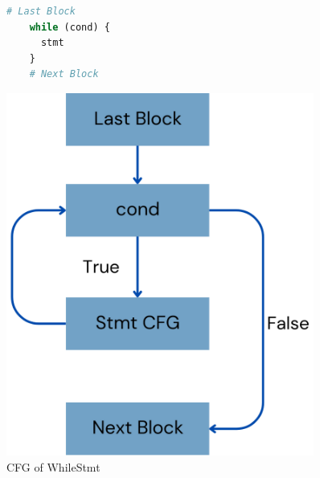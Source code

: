 \begin{figure}
  \centering
  \begin{minipage}{0.45\textwidth}
    \begin{lstlisting}[language=python]
    # Last Block
    while (cond) {
      stmt
    }
    # Next Block
    \end{lstlisting}
  \end{minipage}%
  \hfill
  \begin{minipage}{0.45\textwidth}
    \centering
    \includegraphics[width=0.9\textwidth]{img/whilestmt-cfg.png}
  \end{minipage}
  \caption{CFG of WhileStmt}
\end{figure}

